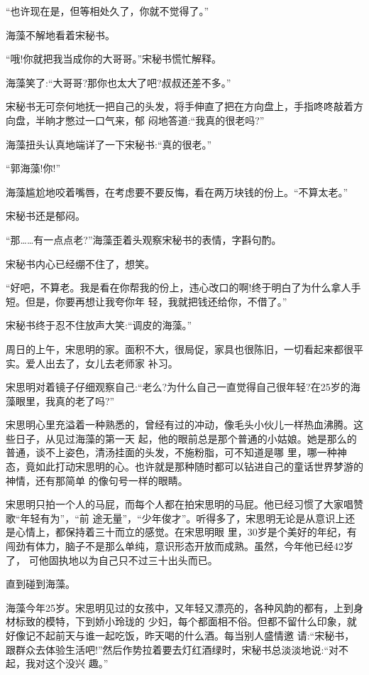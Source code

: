 \documentclass[11pt,a4paper,onecolumn]{article}
\begin{document}
``也许现在是，但等相处久了，你就不觉得了。''

海藻不解地看着宋秘书。

``哦!你就把我当成你的大哥哥。''宋秘书慌忙解释。

海藻笑了:``大哥哥?那你也太大了吧?叔叔还差不多。''

宋秘书无可奈何地抚一把自己的头发，将手伸直了把在方向盘上，手指咚咚敲着方向盘，半晌才憋过一口气来，郁
闷地答道:``我真的很老吗?''

海藻扭头认真地端详了一下宋秘书:``真的很老。''

``郭海藻!你!''

海藻尴尬地咬着嘴唇，在考虑要不要反悔，看在两万块钱的份上。``不算太老。''

宋秘书还是郁闷。

``那……有一点点老?''海藻歪着头观察宋秘书的表情，字斟句酌。

宋秘书内心已经绷不住了，想笑。

``好吧，不算老。我是看在你帮我的份上，违心改口的啊!终于明白了为什么拿人手短。但是，你要再想让我夸你年
轻，我就把钱还给你，不借了。''

宋秘书终于忍不住放声大笑:``调皮的海藻。''

周日的上午，宋思明的家。面积不大，很局促，家具也很陈旧，一切看起来都很平实。爱人出去了，女儿去老师家
补习。

宋思明对着镜子仔细观察自己:``老么?为什么自己一直觉得自己很年轻?在25岁的海藻眼里，我真的老了吗?''

宋思明心里充溢着一种熟悉的，曾经有过的冲动，像毛头小伙儿一样热血沸腾。这些日子，从见过海藻的第一天
起，他的眼前总是那个普通的小姑娘。她是那么的普通，谈不上姿色，清汤挂面的头发，不施粉脂，可不知道是哪
里，哪一种神态，竟如此打动宋思明的心。也许就是那种随时都可以钻进自己的童话世界梦游的神情，还有那简单
的像句号一样的眼睛。

宋思明只拍一个人的马屁，而每个人都在拍宋思明的马屁。他已经习惯了大家唱赞歌\myrule ``年轻有为''，``前
途无量''，``少年俊才''。听得多了，宋思明无论是从意识上还是心情上，都保持着三十而立的感觉。在宋思明眼
里，30岁是个美好的年纪，有闯劲有体力，脑子不是那么单纯，意识形态开放而成熟。虽然，今年他已经42岁了，
可他固执地以为自己只不过三十出头而已。

直到碰到海藻。

海藻今年25岁。宋思明见过的女孩中，又年轻又漂亮的，各种风韵的都有，上到身材标致的模特，下到娇小玲珑的
少妇，每个都面相不俗。但都不留什么印象，就好像记不起前天与谁一起吃饭，昨天喝的什么酒。每当别人盛情邀
请:``宋秘书，跟群众去体验生活吧!''然后作势拉着要去灯红酒绿时，宋秘书总淡淡地说:``对不起，我对这个没兴
趣。''
\end{document}
